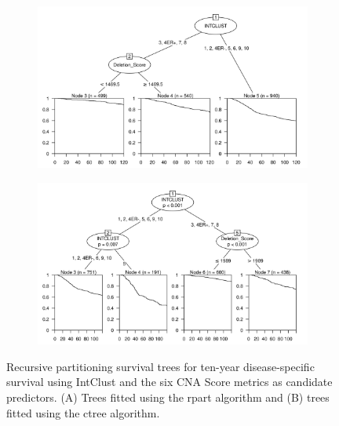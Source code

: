\begin{figure}[!h]
\centering

\vspace{0.5cm}

\begin{subfigure}{\textwidth}
\subcaption{}
\includegraphics[width=1\textwidth]{../figures/Chapter_3/PartyKit_Survival_Score_TenYearDSS_INTCLUST.png}
\end{subfigure}

\vspace{2cm}

\begin{subfigure}{\textwidth}
\subcaption{}
\includegraphics[width=1\textwidth]{../figures/Chapter_3/Ctree_Survival_Score_TenYearDSS_INTCLUST.png}
\end{subfigure}

\vspace{0.5cm}

\caption[Recursive partitioning survival trees for ten-year disease-specific survival using IntClust and the six CNA Score metrics as candidate predictors.]{Recursive partitioning survival trees for ten-year disease-specific survival using IntClust and the six CNA Score metrics as candidate predictors. (A) Trees fitted using the rpart algorithm and (B) trees fitted using the ctree algorithm.}
\label{fig:INTCLUST_CNA_Score_TenYearDSS}
\end{figure}

